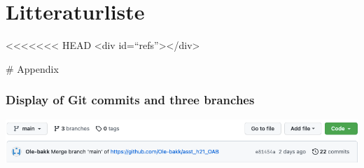\documentclass[
  12pt,
  norsk,
]{article}
\begin{document}
\newpage

\hypertarget{litteraturliste}{%
\section{Litteraturliste}\label{litteraturliste}}

\textless\textless\textless\textless\textless\textless\textless{} HEAD
\textless div id=``refs''\textgreater\textless/div\textgreater{}

\# Appendix

\hypertarget{display-of-git-commits-and-three-branches}{%
\subsubsection{Display of Git commits and three
branches}\label{display-of-git-commits-and-three-branches}}

\includegraphics{images/paste-7A7BFE4C.png}
\end{document}
